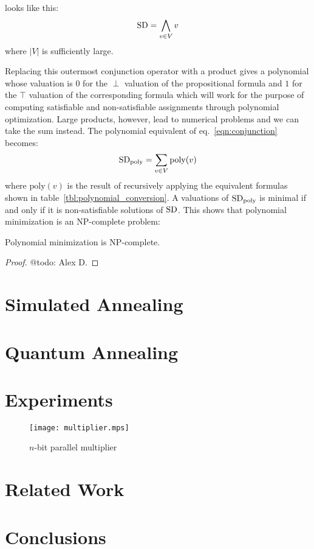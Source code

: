 \documentclass{article}
\begin{document}
\sd looks like this:
%
\begin{eqnarray}
  \label{eqn:conjunction}
  \mathrm{SD} = \bigwedge_{v \in V}{v}
\end{eqnarray}
where $|V|$ is sufficiently large.
\par
Replacing this outermost conjunction operator with a product gives a
polynomial whose valuation is $0$ for the $\perp$ valuation of the
propositional formula and $1$ for the $\top$ valuation of the
corresponding formula which will work for the purpose of computing
satisfiable and non-satisfiable assignments through polynomial
optimization. Large products, however, lead to numerical problems and
we can take the sum instead. The polynomial equivalent of
eq.~\ref{eqn:conjunction} becomes:
%
\begin{eqnarray}
  \label{eqn:conjunction}
  \mathrm{SD}_{\mathrm{poly}} = \sum_{v \in V}{\mathrm{poly}(v)}
\end{eqnarray}
where $\mathrm{poly}(v)$ is the result of recursively applying the
equivalent formulas shown in
table~\ref{tbl:polynomial_conversion}. A valuations of
$\mathrm{SD}_{\mathrm{poly}}$ is minimal if and only if it is non-satisfiable
solutions of $\mathrm{SD}$. This shows that polynomial minimization is an
$\mathrm{NP}$-complete problem:
%
\begin{theorem}
  Polynomial minimization is $\mathrm{NP}$-complete.
\end{theorem}
\begin{proof}
  @todo: Alex D.
\end{proof}
%
\section{Simulated Annealing}
\section{Quantum Annealing}
\section{Experiments}
%
\begin{figure}[htb]
\centering
\texttt{[image: multiplier.mps]}
\caption{$n$-bit parallel multiplier\label{fig:multiplier}}
\end{figure}
%
\section{Related Work}
\section{Conclusions}
\end{document}
